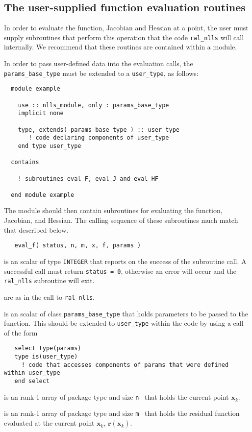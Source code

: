\documentclass{spec}
\newcommand{\scalarintegerio}{is an \intentout scalar of type {\tt INTEGER} }
\newcommand{\ronearrayrealii}[1]{is an \intentin rank-1 array of package type and size {\tt #1}\ }
\newcommand{\ronearrayrealio}[1]{is an \intentout rank-1 array of package type and size {\tt #1}\ }
\newcommand{\vx}{ {\bm x} } %
\newcommand{\vr}{ {\bm r} } %
\newcommand{\iter}[2][k]{ #2_{#1}^{}} %
\begin{document}
\subsection{The user-supplied function evaluation routines}
\label{sec::function_eval}
In order to evaluate the function, Jacobian and Hessian at a point, the user must supply
subroutines that perform this operation that the code {\tt ral\_nlls} will call internally.  
We recommend that these routines are contained within a module.

In order to pass user-defined data into the evaluation calls, the {\tt params\_base\_type} must be extended to a {\tt user\_type}, as follows:
\begin{verbatim}
  module example

    use :: nlls_module, only : params_base_type
    implicit none

    type, extends( params_base_type ) :: user_type
       ! code declaring components of user_type 
    end type user_type
  
  contains 

    ! subroutines eval_F, eval_J and eval_HF

  end module example
\end{verbatim}
The module should then contain subroutines for evaluating the function, Jacobian, and Hessian.
The calling sequence of these subroutines much match that described below.

\begin{verbatim}
   eval_f( status, n, m, x, f, params )
\end{verbatim}

\begin{description}
   \scalarintegerio that reports on the success of the subroutine call.  
  A successful call must return {\tt status = 0}, otherwise an error will occur and the 
  {\tt ral\_nlls} subroutine will  exit.

   are as in the call to {\tt ral\_nlls}.

   is an \intentin scalar of class {\tt params\_base\_type} that holds parameters to be passed to the function.  This should be extended to {\tt user\_type} within the code by using a call of the form
\begin{verbatim}
   select type(params)
   type is(user_type)
     ! code that accesses components of params that were defined within user_type 
   end select
\end{verbatim}

   \ronearrayrealii{n} that holds the current point $\iter{\vx}$.
  
   \ronearrayrealio{m} that holds the residual function 
  evaluated at the current point $\iter{\vx}$, $\vr(\iter{\vx})$.
  
\end{description}
\end{document}
